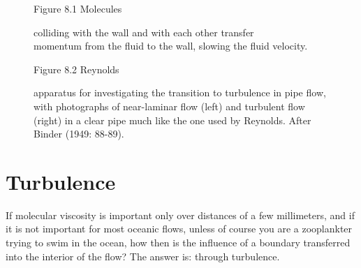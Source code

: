 \begin{figure}[t!]
\centering
\footnotesize
Figure 8.1 Molecules \rule{0mm}{4ex}colliding with the wall and with
each other transfer\\momentum from the fluid to the wall, slowing the
fluid velocity.

\label{fig:viscositysketch}
\vspace{-3ex}
\end{figure}

\begin{figure}[t!]
\footnotesize
Figure 8.2 Reynolds \rule{0mm}{4ex}apparatus for investigating the
transition to turbulence in pipe flow,
with photographs of near-laminar flow (left) and turbulent flow
(right) in a clear pipe much like the one used by Reynolds. After
Binder (1949: 88-89).
\label{fig:reynoldsexp}
\vspace{-4ex}
\end{figure}

\section{Turbulence}
If molecular viscosity is important only
over distances of a few millimeters, and if it is not important for
most oceanic flows, unless of course you are a zooplankter trying to
swim in the ocean, how then is the influence of a boundary transferred
into the interior of the flow? The answer is: through turbulence.

